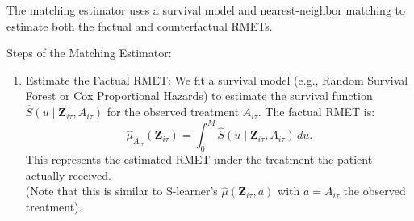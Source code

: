 The matching estimator uses a survival model and nearest-neighbor matching to estimate both the factual and counterfactual RMETs.

Steps of the Matching Estimator:
\begin{enumerate}
\item Estimate the Factual RMET:
   We fit a survival model (e.g., Random Survival Forest or Cox Proportional Hazards) to estimate the survival function $ \widehat{S}(u \mid \mathbf{Z}_{i\tau}, A_{i\tau}) $ for the observed treatment $ A_{i\tau} $. The factual RMET is:
   $$ \widehat{\mu}_{A_{i\tau}}(\mathbf{Z}_{i\tau}) = \int_{0}^{M} \widehat{S}(u \mid \mathbf{Z}_{i\tau}, A_{i\tau}) \, du. $$
   This represents the estimated RMET under the treatment the patient actually received.\\
(Note that this is similar to S-learner’s $\widehat{\mu}(\mathbf{Z}_{i\tau}, a)$ with $a=A_{i\tau}$ the observed treatment).


\end{enumerate}
